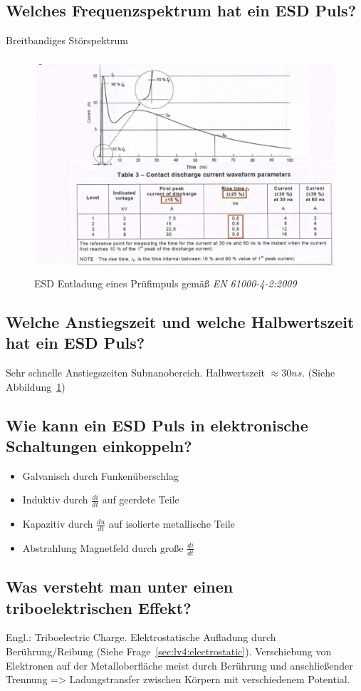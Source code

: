 \subsection{Welches Frequenzspektrum hat ein ESD Puls?}
Breitbandiges Störspektrum

\begin{figure}[ht]
  \centering
  \includegraphics[height=8cm]{src/assets/pictures/lv4_esd_impuls.png}
  \caption{ESD Entladung eines Prüfimpuls gemäß \textit{EN 61000-4-2:2009}}\label{fig:lv4:esd_impuls}
\end{figure}

\subsection{Welche Anstiegszeit und welche Halbwertszeit hat ein ESD Puls?}
Sehr schnelle Anstiegszeiten Subnanobereich. Halbwertszeit \(\approx 30ns\). (Siehe Abbildung~\ref{fig:lv4:esd_impuls})

\subsection{Wie kann ein ESD Puls in elektronische Schaltungen einkoppeln?}
\begin{itemize}
  \item Galvanisch durch Funkenüberschlag
  \item Induktiv durch \(\frac{di}{dt}\) auf geerdete Teile
  \item Kapazitiv durch \(\frac{du}{dt}\) auf isolierte metallische Teile
  \item Abstrahlung Magnetfeld durch große \(\frac{di}{dt}\)
\end{itemize}

\subsection{Was versteht man unter einen triboelektrischen Effekt?}
Engl.: Triboelectric Charge. Elektrostatische Aufladung durch Berührung/Reibung (Siehe Frage~\ref{sec:lv4:electrostatic}). Verschiebung von Elektronen auf der Metalloberfläche meist durch Berührung und anschließender Trennung => Ladungstransfer zwischen Körpern mit verschiedenem Potential.

